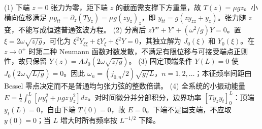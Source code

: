 (1) 下端 \(z=0\) 张力为零，距下端 \(z\) 的截面需支撑下方重量，故 \(T(z)=\mu gz\)。小横向位移满足 \(\mu y_{tt}=\partial_z(Ty_z)=\mu g(z y_z)_z\)，即 \(y_{tt}=g(z y_{zz}+y_z)\)。张力随 \(z\) 变，不能写成恒速普通弦波方程。
(2) 分离后 \(zY''+Y'+(\omega^2/g)Y=0\)。置 \(\xi=2\omega\sqrt{z/g}\)，可化为 \(\xi^2Y_{\xi\xi}+\xi Y_\xi+\xi^2Y=0\)，其独立解为 \(J_0(\xi)\) 和 \(Y_0(\xi)\)。在 \(z\to0^+\) 时第二种 Neumann 函数对数发散，不满足有限位移与可接受端点正则性，故只保留 \(Y(z)=A J_0(2\omega\sqrt{z/g})\)。
(3) 固定顶端条件 \(Y(L)=0\) 使 \(J_0(2\omega\sqrt{L/g})=0\)。因此 \(\omega_n=(j_{0,n}/2)\sqrt{g/L}\)，\(n=1,2,\ldots\)；本征频率间距由 Bessel 零点决定而不是普通均匀张力弦的整数倍谱。
(4) 全系统的小振动能量 \(E=\frac12\int_0^L[\mu y_t^2+\mu gz\,y_z^2]dz\)。对时间微分并分部积分，边界功率 \([T y_z y_t]_0^L\)：顶端 \(y_t(L)=0\)，自由下端 \(T(0)=0\)，故 \(\dot E=0\)。下端不是固支端，不应取 \(y(0)=0\)；当 \(L\) 增大时所有频率按 \(L^{-1/2}\) 下降。
